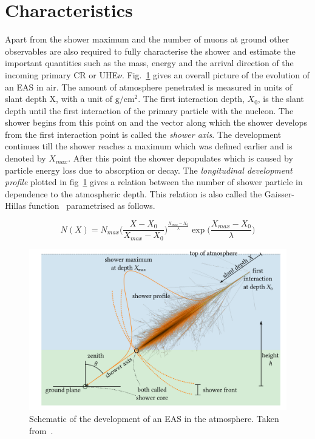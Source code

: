 \section{Characteristics}
\label{sec:EAS_cha}
Apart from the shower maximum and the number of muons at ground other observables are also required to fully characterise the shower and estimate the important quantities such as the mass, energy and the arrival direction of the incoming primary CR or UHE$\nu$. Fig.~\ref{fig:EAS_schematic} gives an overall picture of the evolution of an EAS in air. The amount of atmosphere penetrated is measured in units of slant depth X, with a unit of $\mathrm{g/cm^2}$. The first interaction depth, $X_0$, is the slant depth until the first interaction of the primary particle with the nucleon. The shower begins from this point on and the vector along which the shower develops from the first interaction point is called the \textit{shower axis}. The development continues till the shower reaches a maximum which was defined earlier and is denoted by $X_{max}$. After this point the shower depopulates which is caused by particle energy loss due to absorption or decay. The \textit{longitudinal development profile} plotted in fig~\ref{fig:EAS_schematic} gives a relation between the number of shower particle in dependence to the atmospheric depth. This relation is also called the Gaisser-Hillas function~\cite{1977ICRC....8..353G} parametrised as follows.

\begin{equation}
    N(X) =  N_{max} \biggl(\frac{X- X_0}{X_{max} -  X_0}\biggr)^{\frac{X_{max}-X_0}{\lambda}} \exp \biggl(\frac{X_{max}-X_0}{\lambda}\biggr)
\end{equation}

\begin{figure}[t!]
    \centering
    \includegraphics[width=14.5cm]{thesis_figures/EAS/EAS_schematic.png}
    \caption{Schematic of the development of an EAS in the atmosphere. Taken from~\cite{thesis:mayotte2021}.} 
    \label{fig:EAS_schematic}
\end{figure}

